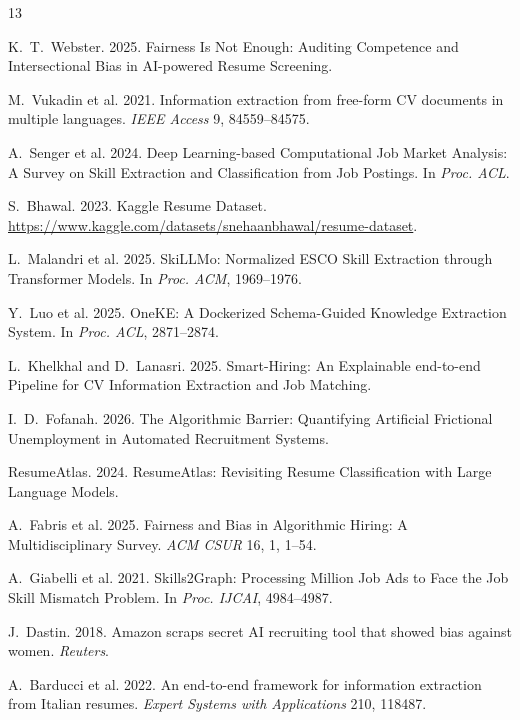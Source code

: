 \documentclass[sigconf, authorversion, nonacm]{acmart}
\begin{document}

\begin{thebibliography}{13}

K.~T.~Webster. 2025.
\newblock Fairness Is Not Enough: Auditing Competence and Intersectional Bias
  in AI-powered Resume Screening.

M.~Vukadin et al. 2021.
\newblock Information extraction from free-form CV documents in multiple
  languages.
\newblock \emph{IEEE Access} 9, 84559--84575.

A.~Senger et al. 2024.
\newblock Deep Learning-based Computational Job Market Analysis: A Survey on
  Skill Extraction and Classification from Job Postings.
\newblock In \emph{Proc. ACL}.

S.~Bhawal. 2023.
\newblock Kaggle Resume Dataset.
\newblock \url{https://www.kaggle.com/datasets/snehaanbhawal/resume-dataset}.

L.~Malandri et al. 2025.
\newblock SkiLLMo: Normalized ESCO Skill Extraction through Transformer Models.
\newblock In \emph{Proc. ACM}, 1969--1976.

Y.~Luo et al. 2025.
\newblock OneKE: A Dockerized Schema-Guided Knowledge Extraction System.
\newblock In \emph{Proc. ACL}, 2871--2874.

L.~Khelkhal and D.~Lanasri. 2025.
\newblock Smart-Hiring: An Explainable end-to-end Pipeline for CV Information
  Extraction and Job Matching.

I.~D.~Fofanah. 2026.
\newblock The Algorithmic Barrier: Quantifying Artificial Frictional
  Unemployment in Automated Recruitment Systems.

ResumeAtlas. 2024.
\newblock ResumeAtlas: Revisiting Resume Classification with Large Language
  Models.

A.~Fabris et al. 2025.
\newblock Fairness and Bias in Algorithmic Hiring: A Multidisciplinary Survey.
\newblock \emph{ACM CSUR} 16, 1, 1--54.

A.~Giabelli et al. 2021.
\newblock Skills2Graph: Processing Million Job Ads to Face the Job Skill
  Mismatch Problem.
\newblock In \emph{Proc. IJCAI}, 4984--4987.

J.~Dastin. 2018.
\newblock Amazon scraps secret AI recruiting tool that showed bias against
  women.
\newblock \emph{Reuters}.

A.~Barducci et al. 2022.
\newblock An end-to-end framework for information extraction from Italian
  resumes.
\newblock \emph{Expert Systems with Applications} 210, 118487.

\end{thebibliography}

\balance
\end{document}
